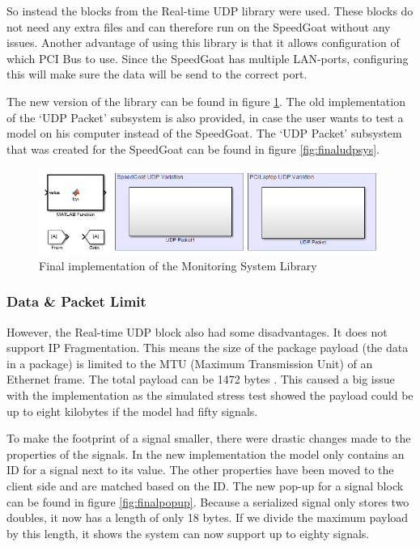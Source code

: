 So instead the blocks from the Real-time UDP library were used. These blocks do not need any extra files and can therefore run on the SpeedGoat without any issues. Another advantage of using this library is that it allows configuration of which PCI Bus to use. Since the SpeedGoat has multiple LAN-ports, configuring this will make sure the data will be send to the correct port.

The new version of the library can be found in figure \ref{fig:finalmonsys}. The old implementation of the `UDP Packet' subsystem is also provided, in case the user wants to test a model on his computer instead of the SpeedGoat. The `UDP Packet' subsystem that was created for the SpeedGoat can be found in figure \ref{fig:finaludpsys}.

\begin{figure}[H]
	\centering
	\includegraphics[width=.9\textwidth]{implementation/libraryfinal}
	\caption{Final implementation of the Monitoring System Library} 
	\label{fig:finalmonsys}
\end{figure}

\subsubsection{Data \& Packet Limit}
However, the Real-time UDP block also had some disadvantages. It does not support IP Fragmentation. This means the size of the package payload (the data in a package) is limited to the MTU (Maximum Transmission Unit) of an Ethernet frame. The total payload can be 1472 bytes \cite{web:RealTimeUdp}. This caused a big issue with the implementation as the simulated stress test showed the payload could be up to eight kilobytes if the model had fifty signals.

To make the footprint of a signal smaller, there were drastic changes made to the properties of the signals. In the new implementation the model only contains an ID for a signal next to its value. The other properties have been moved to the client side and are matched based on the ID. The new pop-up for a signal block can be found in figure \ref{fig:finalpopup}. Because a serialized signal only stores two doubles, it now has a length of only 18 bytes. If we divide the maximum payload by this length, it shows the system can now support up to eighty signals.

